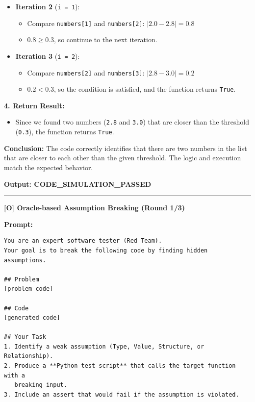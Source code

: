 \documentclass[11pt]{article}
\begin{document}
\begin{tcolorbox}[breakable, colback=white, colframe=black!70, boxrule=0.5pt, arc=2pt, left=4mm, right=4mm, top=3mm, bottom=3mm]
\begin{itemize}
    \item \textbf{Iteration 2} (\texttt{i = 1}):
    \begin{itemize}
        \item Compare \texttt{numbers[1]} and \texttt{numbers[2]}: $|2.0 - 2.8| = 0.8$
        \item $0.8 \geq 0.3$, so continue to the next iteration.
    \end{itemize}
    
    \item \textbf{Iteration 3} (\texttt{i = 2}):
    \begin{itemize}
        \item Compare \texttt{numbers[2]} and \texttt{numbers[3]}: $|2.8 - 3.0| = 0.2$
        \item $0.2 < 0.3$, so the condition is satisfied, and the function returns \texttt{True}.
    \end{itemize}
\end{itemize}

\textbf{4. Return Result:}
\begin{itemize}
    \item Since we found two numbers (\texttt{2.8} and \texttt{3.0}) that are closer than the threshold (\texttt{0.3}), the function returns \texttt{True}.
\end{itemize}

\textbf{Conclusion:} The code correctly identifies that there are two numbers in the list that are closer to each other than the given threshold. The logic and execution match the expected behavior.

\textbf{Output: CODE\_SIMULATION\_PASSED}

\vspace{0.5cm} \hrule \vspace{0.5cm}

\noindent\textbf{\Large [O] Oracle-based Assumption Breaking (Round 1/3)}

\textbf{Prompt:}
\begin{verbatim}
You are an expert software tester (Red Team).
Your goal is to break the following code by finding hidden assumptions.

## Problem
[problem code]

## Code
[generated code]

## Your Task
1. Identify a weak assumption (Type, Value, Structure, or Relationship).
2. Produce a **Python test script** that calls the target function with a 
   breaking input.
3. Include an assert that would fail if the assumption is violated.


\end{verbatim}
\end{tcolorbox}
\end{document}
